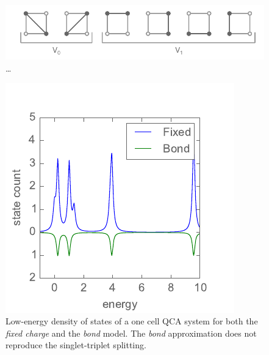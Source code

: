 %
\begin{figure}
  \center
  \includegraphics{bond}
  \caption{\ldots}
  \label{fig:bond}
\end{figure}
\begin{figure}
  \center
  \includegraphics{bond_approximation1}
  \caption{Low-energy density of states of a one cell QCA system for both the
  \emph{fixed charge} and the \emph{bond} model. The \emph{bond} approximation
  does not reproduce the singlet-triplet splitting.}
  \label{fig:bond_approximation1}
\end{figure}
%
